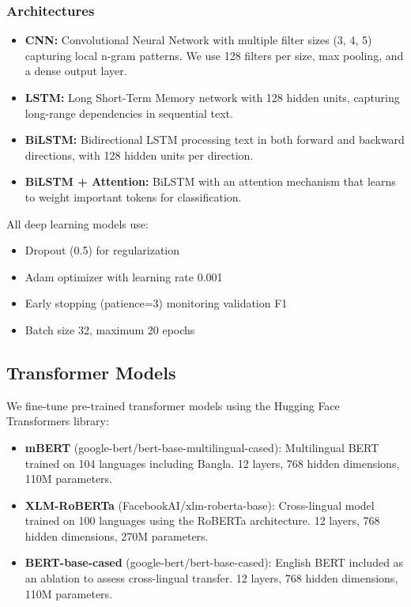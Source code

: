 \documentclass[conference]{IEEEtran}
\begin{document}
\subsubsection{Architectures}
\begin{itemize}
\item \textbf{CNN:} Convolutional Neural Network with multiple filter sizes (3, 4, 5) capturing local n-gram patterns. We use 128 filters per size, max pooling, and a dense output layer.
\item \textbf{LSTM:} Long Short-Term Memory network with 128 hidden units, capturing long-range dependencies in sequential text.
\item \textbf{BiLSTM:} Bidirectional LSTM processing text in both forward and backward directions, with 128 hidden units per direction.
\item \textbf{BiLSTM + Attention:} BiLSTM with an attention mechanism that learns to weight important tokens for classification.
\end{itemize}

All deep learning models use:
\begin{itemize}
\item Dropout (0.5) for regularization
\item Adam optimizer with learning rate 0.001
\item Early stopping (patience=3) monitoring validation F1
\item Batch size 32, maximum 20 epochs
\end{itemize}

\subsection{Transformer Models}

We fine-tune pre-trained transformer models using the Hugging Face Transformers library:

\begin{itemize}
\item \textbf{mBERT} (google-bert/bert-base-multilingual-cased): Multilingual BERT trained on 104 languages including Bangla. 12 layers, 768 hidden dimensions, 110M parameters.
\item \textbf{XLM-RoBERTa} (FacebookAI/xlm-roberta-base): Cross-lingual model trained on 100 languages using the RoBERTa architecture. 12 layers, 768 hidden dimensions, 270M parameters.
\item \textbf{BERT-base-cased} (google-bert/bert-base-cased): English BERT included as an ablation to assess cross-lingual transfer. 12 layers, 768 hidden dimensions, 110M parameters.
\end{itemize}
\end{document}
